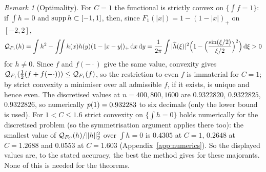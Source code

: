 \documentclass[11pt]{amsart}
\theoremstyle{definition}
\theoremstyle{remark}
\newtheorem{remark}[theorem]{Remark}
\numberwithin{equation}{section}
\begin{document}
\begin{remark}[Optimality]\label{rem:optimal}
For $C=1$ the functional is strictly convex on $\{\int f=1\}$: if $\int h=0$ and $\operatorname{supp} h\subset[-1,1]$, then, since $F_1(|x|)=1-(1-|x|)_+$ on $[-2,2]$,
\[
\mathcal Q_{F_1}(h)=\int h^2-\iint h(x)h(y)(1-|x-y|)_+\,\mathrm d x\,\mathrm d y=\frac1{2\pi}\int|\widehat h(\xi)|^2\Big(1-\Big(\frac{\sin(\xi/2)}{\xi/2}\Big)^2\Big)\,\mathrm d\xi>0
\]
for $h\ne0$. Since $f$ and $f(-\cdot)$ give the same value, convexity gives $\mathcal Q_{F_1}(\frac12(f+f(-\cdot)))\le\mathcal Q_{F_1}(f)$, so the restriction to even $f$ is immaterial for $C=1$; by strict convexity a minimiser over all admissible $f$, if it exists, is unique and hence even. The discretised values at $n=400,800,1600$ are $0.9322820$, $0.9322825$, $0.9322826$, so numerically $p(1)=0.932283$ to six decimals (only the lower bound is used). For $1<C\le1.6$ strict convexity on $\{\int h=0\}$ holds numerically for the discretised problem (so the symmetrisation argument applies there too): the smallest value of $\mathcal Q_{F_C}(h)/\|h\|_2^2$ over $\int h=0$ is $0.4305$ at $C=1$, $0.2648$ at $C=1.2688$ and $0.0553$ at $C=1.603$ (Appendix~\ref{app:numerics}). So the displayed values are, to the stated accuracy, the best the method gives for these majorants. None of this is needed for the theorems.
\end{remark}
\end{document}

